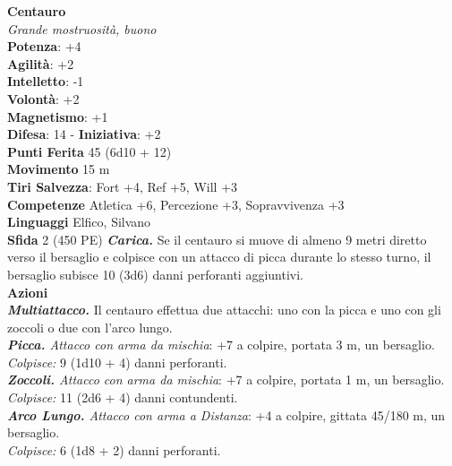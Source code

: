 \begin{multicols}{2}
\medskip\textbf{Centauro}\\
\emph{Grande mostruosità, buono}\\
\textbf{Potenza}: +4\\
\textbf{Agilità}: +2\\
\textbf{Intelletto}: -1\\
\textbf{Volontà}: +2\\
\textbf{Magnetismo}: +1\\
\textbf{Difesa}: 14 - \textbf{Iniziativa}: +2\\
\textbf{Punti Ferita} 45 (6d10 + 12)\\
\textbf{Movimento} 15 m\\
\textbf{Tiri Salvezza}: Fort +4, Ref +5, Will +3\\
\textbf{Competenze} Atletica +6, Percezione +3, Sopravvivenza +3\\
\textbf{Linguaggi} Elfico, Silvano\\
\textbf{Sfida} 2 (450 PE)\smallskip
\emph{\textbf{Carica.}} Se il centauro si muove di almeno 9 metri diretto verso il bersaglio e colpisce con un attacco di picca durante lo stesso turno, il bersaglio subisce 10 (3d6) danni perforanti aggiuntivi. \\
\smallskip\textbf{Azioni}\\
\emph{\textbf{Multiattacco.}} Il centauro effettua due attacchi: uno con la picca e uno con gli zoccoli o due con l'arco lungo.\\
\emph{\textbf{Picca.} Attacco con arma da mischia}: +7 a colpire, portata 3 m, un bersaglio.\\
\emph{Colpisce:} 9 (1d10 + 4) danni perforanti.\\
\emph{\textbf{Zoccoli.} Attacco con arma da mischia}: +7 a colpire, portata 1 m, un bersaglio.\\
\emph{Colpisce:} 11 (2d6 + 4) danni contundenti.\\
\emph{\textbf{Arco Lungo.} Attacco con arma a Distanza}: +4 a colpire, gittata 45/180 m, un bersaglio.\\
\emph{Colpisce:} 6 (1d8 + 2) danni perforanti.\\


\end{multicols}
